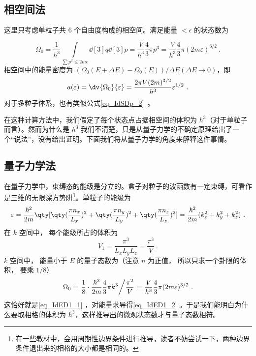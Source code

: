 
\subsection{相空间法}
这里只考虑单粒子共 $6$ 个自由度构成的相空间。满足能量 $<\epsilon$ 的状态数为

\begin{equation}\label{eq_IdED1_1}
\Omega_0 = \frac{1}{h^3}\int\limits_{\sum {p^2}  \leqslant 2m\epsilon} \dd[3]{q} \dd[3]{p}
 = \frac{V}{h^3}\frac43 \pi {p^3}
 = \frac{V}{h^3}\frac43 \pi (2m\varepsilon)^{3/2}~.
\end{equation}
相空间中的能量密度为 $(\Omega_0(E+\Delta E)-\Omega_0(E))/\Delta E(\Delta E\rightarrow 0)$，即
\begin{equation}\label{eq_IdED1_2}
a(\varepsilon) = \dv{\Omega_0}{\varepsilon} = \frac{2\pi V(2m)^{3/2}}{h^3} \varepsilon^{1/2}~.
\end{equation}
对于多粒子体系，也有类似公式\autoref{eq_IdSDp_2}~。

在这种计算方法中，我们假定了每个状态点占据相空间的体积为 $h^3$（对于单粒子而言）。然而为什么是 $h^3$ 我们不清楚，只是从量子力学的不确定原理给出了一个“说法”，没有给出证明。下面我们将从量子力学的角度来解释这件事情。
\subsection{量子力学法}
在量子力学中，束缚态的能级是分立的。盒子对粒子的波函数有一定束缚，可看作是三维的无限深方势阱\footnote{在一些教材中，会用周期性边界条件进行推导，读者不妨尝试一下，两种边界条件退出来的相格的大小都是相同的。}。单粒子的能级为
\begin{equation}
\varepsilon = \frac{\hbar ^2}{2m} \qty[\qty(\frac{\pi n_x}{L_x})^2 + \qty(\frac{\pi n_y}{L_y})^2 + \qty(\frac{\pi n_z}{L_z})^2] = \frac{\hbar ^2}{2m} (k_x^2 + k_y^2 + k_z^2)~.
\end{equation}
在 $k$ 空间中， 每个能级所占的体积为
\begin{equation}
V_1 = \frac{\pi^3}{L_x L_y L_z} = \frac{\pi^3}{V}~.
\end{equation}
$k$ 空间中， 能量小于 $E$ 的量子态数为（注意 $n$ 为正值， 所以只求一个卦限的体积， 要乘 $1/8$）
\begin{equation}
\Omega_0 = \left. \frac18\cdot \frac{\hbar^2}{2m}\frac43 \pi k^3 \middle/ \frac{\pi^2}{V} \right. = \frac{V}{h^3}\frac43 \pi(2m\varepsilon)^{3/2}~.
\end{equation}
这恰好就是\autoref{eq_IdED1_1} ，对能量求导得\autoref{eq_IdED1_2} 。于是我们能明白为什么要取相格的体积为 $h^3$，这样推导出的微观状态数才与量子态数相符。
